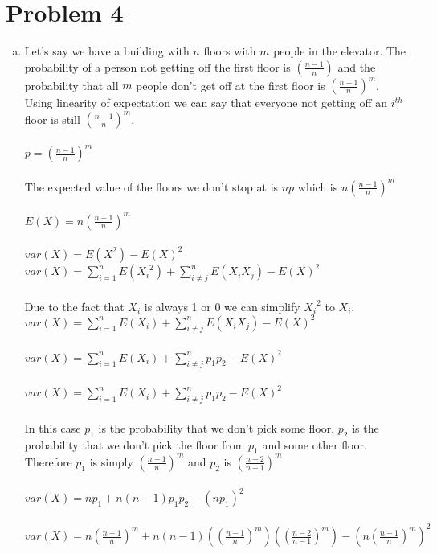 \documentclass[11pt,letterpaper]{article}
\begin{document}
\section*{Problem 4}
\begin{enumerate}[(a)]
\item
Let's say we have a building with $n$ floors with $m$ people in the elevator. The probability of a person not getting off the first floor is $(\frac{n-1}{n})$ and the probability that all $m$ people don't get off at the first floor is $(\frac{n-1}{n})^m$. Using linearity of expectation we can say that everyone not getting off an $i^{th}$  floor is still $(\frac{n-1}{n})^m$.\\\\
$p = (\frac{n-1}{n})^m$\\\\
The expected value of the floors we don't stop at is $np$ which is $n(\frac{n-1}{n})^m$\\\\
$E(X) = n(\frac{n-1}{n})^m$\\\\
$var(X) = E(X^2) -E(X)^2$\\
$var(X) = \sum\limits_{i=1}^nE({X_i}^2)  + \sum\limits_{i \neq j}^nE({X_iX_j})-E(X)^2$\\\\
Due to the fact that $X_i$ is always 1 or 0 we can simplify ${X_i}^2$ to $X_i$.\\
$var(X) = \sum\limits_{i=1}^nE({X_i})  + \sum\limits_{i \neq j}^nE({X_iX_j})-E(X)^2$\\\\
$var(X) = \sum\limits_{i=1}^nE({X_i})  + \sum\limits_{i \neq j}^np_1p_2-E(X)^2$\\\\
$var(X) = \sum\limits_{i=1}^nE({X_i})  + \sum\limits_{i \neq j}^np_1p_2-E(X)^2$\\\\
In this case $p_1$ is the probability that we don't pick some floor. $p_2$ is the probability that we don't pick the floor from $p_1$ and some other floor.\\
Therefore $p_1$ is simply $(\frac{n-1}{n})^m$ and $p_2$ is $(\frac{n-2}{n-1})^m$\\\\
$var(X) = np_1  + n(n-1)p_1p_2- (np_1)^2$\\\\
$var(X) = n(\frac{n-1}{n})^m  + n(n-1)((\frac{n-1}{n})^m)((\frac{n-2}{n-1})^m)- (n(\frac{n-1}{n})^m)^2$\\\\

\end{enumerate}
\end{document}
